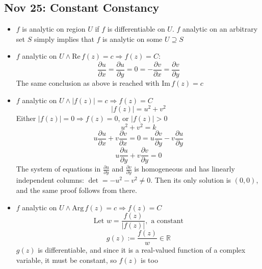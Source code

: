 \documentclass[10pt, oneside]{article}
\let\del\partial
\newcommand{\R}{\mathbb{R}}
\renewcommand{\Re}{\text{Re} \,}
\renewcommand{\Im}{\text{Im} \,}
\newcommand{\Arg}{\text{Arg} \,}
\begin{document}
\subsection{Nov 25: Constant Constancy}
\begin{itemize}
    \item $f$ is analytic on region $U$ if $f$ is differentiable on $U$. $f$ analytic on an arbitrary set $S$ simply implies that $f$ is analytic on some $U \supseteq S$
    \item $f$ analytic on $U \land \Re f(z) = c \Rightarrow f(z) = C$:
        \[\frac{\del u}{\del x} = \frac{\del u}{\del y} = 0 = -\frac{\del v}{\del x} = \frac{\del v}{\del y}\]
        The same conclusion as above is reached with $\Im f(z) = c$
    \item $f$ analytic on $U \land |f(z)| = c \Rightarrow f(z) = C$
        \[|f(z)| = u^2 + v^2\]
        Either $|f(z)| = 0 \Rightarrow f(z) = 0$, or $|f(z)| > 0$
        \[u^2 + v^2 = k\]
        \[u\frac{\del u}{\del x} + v\frac{\del v}{\del x} = 0 = u\frac{\del v}{\del y} - v\frac{\del u}{\del y}\]
        \[u\frac{\del u}{\del y} + v\frac{\del v}{\del y} = 0\]
        The system of equations in $\frac{\del u}{\del y}$ and $\frac{\del v}{\del y}$ is homogeneous and has linearly independent columns: $\det = -u^2 - v^2 \neq 0$. Then its only solution is $(0,0)$, and the same proof follows from there.
    \item $f$ analytic on $U \land \Arg f(z) = c \Rightarrow f(z) = C$
        \[\text{Let } w = \frac{f(z)}{|f(z)|}, \text{ a constant}\]
        \[g(z) := \frac{f(z)}{w} \in \R\]
        $g(z)$ is differentiable, and since it is a real-valued function of a complex variable, it must be constant, so $f(z)$ is too
\end{itemize}
\end{document}
